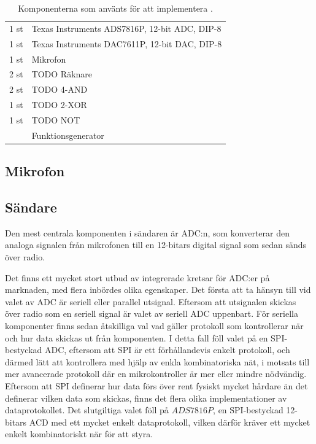 \documentclass[a4paper,10pt]{article}
\begin{document}
\begin{table}
    \centering
    \begin{tabular}{|l|l|}
    \hline
    1 st & Texas Instruments ADS7816P, 12-bit ADC, DIP-8 \\
    1 st & Texas Instruments DAC7611P, 12-bit DAC, DIP-8 \\
    1 st & Mikrofon \\
    2 st & TODO Räknare \\
    2 st & TODO 4-AND \\
    1 st & TODO 2-XOR \\
    1 st & TODO NOT \\
	 & Funktionsgenerator \\
    \hline
    \end{tabular}
    
    \caption{Komponenterna som använts för att implementera .}
    \label{tab:komponenter}

\end{table}

\subsection{Mikrofon}



\subsection{Sändare}

Den mest centrala komponenten i sändaren är ADC:n, som konverterar den analoga
signalen från mikrofonen till en 12-bitars digital signal som sedan sänds över
radio.

Det finns ett mycket stort utbud av integrerade kretsar för ADC:er på marknaden,
med flera inbördes olika egenskaper. Det första att ta hänsyn till vid valet av
ADC är seriell eller parallel utsignal. Eftersom att utsignalen skickas över 
radio som en seriell signal är valet av seriell ADC uppenbart. För seriella 
komponenter finns sedan åtskilliga val vad gäller protokoll som kontrollerar när
och hur data skickas ut från komponenten. I detta fall föll valet på en 
SPI-bestyckad ADC, eftersom att SPI är ett förhållandevis enkelt protokoll, och
därmed lätt att kontrollera med hjälp av enkla kombinatoriska nät, i motsats 
till mer avancerade protokoll där en mikrokontroller är mer eller mindre
nödvändig. Eftersom att SPI definerar hur data förs över rent fysiskt mycket
hårdare än det definerar vilken data som skickas, finns det flera olika 
implementationer av dataprotokollet. Det slutgiltiga valet föll på $ADS7816P$,
en SPI-bestyckad 12-bitars ACD med ett mycket enkelt dataprotokoll, vilken 
därför kräver ett mycket enkelt kombinatoriskt när för att styra.
\end{document}
